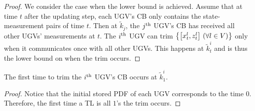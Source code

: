 	\begin{proof}
		We consider the case when the lower bound is achieved.
		Assume that at time $t$ after the updating step, each UGV's CB only contains the state-measurement pairs of time $t$.
		Then at $\tilde{k}_j$, the $j^\text{th}$ UGV's CB has received all other UGVs' measurements at $t$.
		The $i^\text{th}$ UGV can trim $\left\lbrace\left[x^l_t,z^l_t\right] \,(\forall l\in V)\right\rbrace$ only when it communicates once with all other UGVs. 
		This happens at $\tilde{k}^i_t$ and is thus the lower bound on when the trim occurs. 
		
		
	\end{proof}
	
	
	\begin{cor}
		The first time to trim the $i^\text{th}$ UGV's CB occurs at $\tilde{k}^i_1$.
	\end{cor}
	
	\begin{proof}
		Notice that the initial stored PDF of each UGV corresponds to the time $0$.
		Therefore, the first time a TL is all $1$'s the trim occurs.
	\end{proof}	
	
